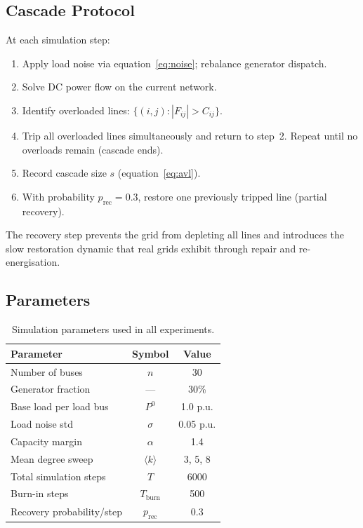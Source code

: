 \documentclass[12pt,a4paper]{article}
\begin{document}
\subsection{Cascade Protocol}

At each simulation step:
\begin{enumerate}
    \item Apply load noise via equation~\eqref{eq:noise};
          rebalance generator dispatch.
    \item Solve DC power flow on the current network.
    \item Identify overloaded lines: $\{(i,j): |F_{ij}| > C_{ij}\}$.
    \item Trip all overloaded lines simultaneously and return to
          step~2. Repeat until no overloads remain (cascade ends).
    \item Record cascade size $s$ (equation~\ref{eq:avl}).
    \item With probability $p_\text{rec} = 0.3$, restore one
          previously tripped line (partial recovery).
\end{enumerate}
The recovery step prevents the grid from depleting all lines and
introduces the slow restoration dynamic that real grids exhibit
through repair and re-energisation.

\subsection{Parameters}

\begin{table}[H]
\centering
\renewcommand{\arraystretch}{1.3}
\caption{Simulation parameters used in all experiments.}
\label{tab:params}
\begin{tabular}{p{5.5cm} c c}
    \toprule
    \textbf{Parameter} & \textbf{Symbol} & \textbf{Value} \\
    \midrule
    Number of buses           & $n$               & 30 \\
    Generator fraction        & ---               & 30\% \\
    Base load per load bus    & $P^0$             & 1.0 p.u. \\
    Load noise std            & $\sigma$          & 0.05 p.u. \\
    Capacity margin           & $\alpha$          & 1.4 \\
    Mean degree sweep         & $\langle k\rangle$& 3, 5, 8 \\
    Total simulation steps    & $T$               & 6000 \\
    Burn-in steps             & $T_\text{burn}$   & 500 \\
    Recovery probability/step & $p_\text{rec}$    & 0.3 \\
    \bottomrule
\end{tabular}
\end{table}
\end{document}
